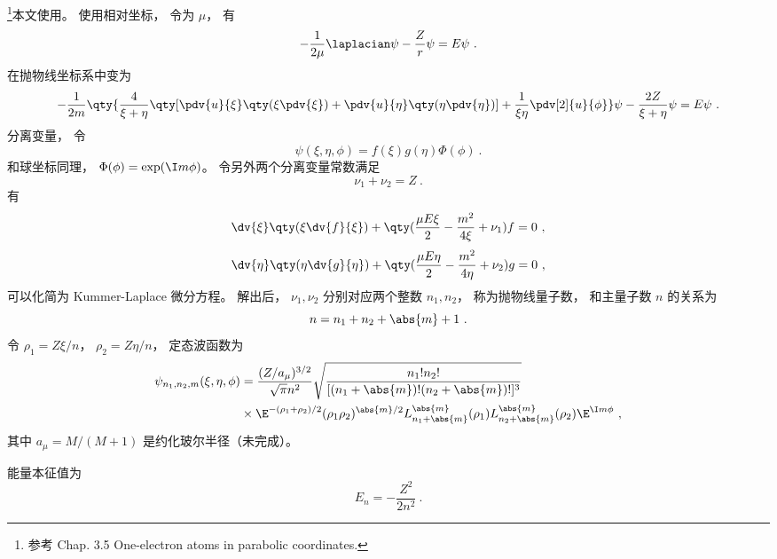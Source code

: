 
\begin{issues}
\issueDraft
{}
\end{issues}


\footnote{参考 \cite{Bransden} Chap. 3.5 One-electron atoms in parabolic coordinates.}本文使用。 使用相对坐标， 令为 $\mu$， 有
\begin{equation}
-\frac{1}{2\mu} \laplacian \psi - \frac{Z}{r} \psi = E\psi~.
\end{equation}
在抛物线坐标系中变为
\begin{equation}
-\frac{1}{2m} \qty{\frac{4}{\xi + \eta} \qty[\pdv{u}{\xi}\qty(\xi\pdv{\xi}) + \pdv{u}{\eta}\qty(\eta\pdv{\eta})] + \frac{1}{\xi\eta}\pdv[2]{u}{\phi}}\psi - \frac{2Z}{\xi + \eta}\psi = E\psi~.
\end{equation}
分离变量， 令
\begin{equation}
\psi(\xi, \eta, \phi) = f(\xi) g(\eta) \Phi(\phi)~.
\end{equation}
和球坐标同理， $\Phi(\phi) = \exp(\I m \phi)$。 令另外两个分离变量常数满足
\begin{equation}
\nu_1 + \nu_2 = Z~.
\end{equation}
有
\begin{equation}\label{eq_ParaHy_1}
\dv{\xi} \qty(\xi \dv{f}{\xi}) + \qty(\frac{\mu E \xi}{2} - \frac{m^2}{4\xi} + \nu_1) f = 0~,
\end{equation}
\begin{equation}
\dv{\eta}\qty(\eta \dv{g}{\eta}) + \qty(\frac{\mu E\eta}{2} - \frac{m^2}{4\eta} + \nu_2)g = 0~,
\end{equation}
可以化简为 Kummer-Laplace 微分方程。 解出后， $\nu_1, \nu_2$ 分别对应两个整数 $n_1, n_2$， 称为抛物线量子数， 和主量子数 $n$ 的关系为
\begin{equation}
n = n_1 + n_2 + \abs{m} + 1~.
\end{equation}
令 $\rho_1 = Z\xi / n$， $\rho_2 = Z\eta/n$， 定态波函数为
\begin{equation}\label{eq_ParaHy_2}
\begin{aligned}
\psi_{n_1,n_2,m}(\xi,\eta,\phi) &= \frac{(Z/a_\mu)^{3/2}}{\sqrt{\pi} n^2} \sqrt{\frac{n_1!n_2!}{[(n_1+\abs{m})!(n_2+\abs{m})!]^3}} \\
&\times \E^{-(\rho_1+\rho_2)/2}(\rho_1\rho_2)^{\abs{m}/2} L_{n_1 + \abs{m}}^{\abs{m}}(\rho_1) L_{n_2 + \abs{m}}^{\abs{m}}(\rho_2) \E^{\I m\phi}~,
\end{aligned}
\end{equation}
其中 $a_\mu = M/(M + 1)$ 是约化玻尔半径（未完成）。

能量本征值为
\begin{equation}
E_n = -\frac{Z^2}{2n^2}~.
\end{equation}
